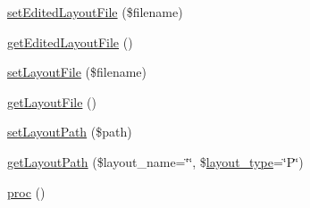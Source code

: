 \begin{DoxyCompactItemize}
\item 
\hyperlink{classModuleObject_a28e95b299aeac82b450e6ed8b121ff05}{set\+Edited\+Layout\+File} (\$filename)
\item 
\hyperlink{classModuleObject_a14fc83257a1518a1753c50cb11289c27}{get\+Edited\+Layout\+File} ()
\item 
\hyperlink{classModuleObject_aab99465b1bac81df148c829a3b14f933}{set\+Layout\+File} (\$filename)
\item 
\hyperlink{classModuleObject_af446ac0f9c2a19c2629f30afd6271ec6}{get\+Layout\+File} ()
\item 
\hyperlink{classModuleObject_a15410a43eadf4aa49e4fed4b26cd1f25}{set\+Layout\+Path} (\$path)
\item 
\hyperlink{classModuleObject_ad3f6b56ddff1e52a49015771d0a08336}{get\+Layout\+Path} (\$layout\+\_\+name=\char`\"{}\char`\"{}, \$\hyperlink{ko_8install_8php_a0532d89570cfdaebc628afac2ff5a81b}{layout\+\_\+type}=\char`\"{}P\char`\"{})
\item 
\hyperlink{classModuleObject_a621ea29505c6ccd4444a06bc1c8554a5}{proc} ()
\end{DoxyCompactItemize}
